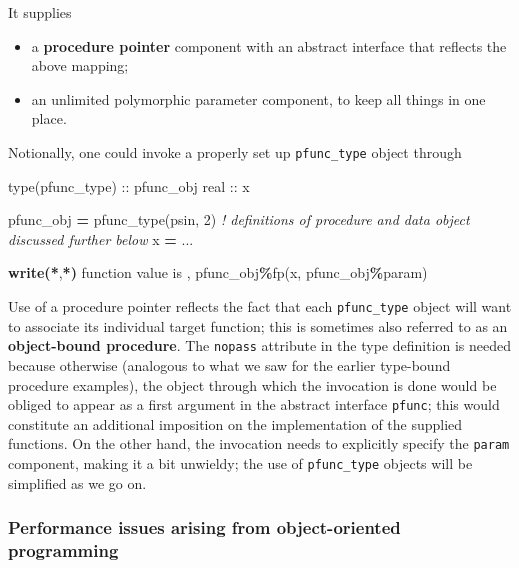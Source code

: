 \documentclass[
  paper=a4,
  ,captions=tableheading
]{scrartcl}
\newenvironment{Shaded}{\begin{snugshade}}{\end{snugshade}}
\newcommand{\CommentTok}[1]{\textcolor[rgb]{0.56,0.35,0.01}{\textit{#1}}}
\newcommand{\DataTypeTok}[1]{\textcolor[rgb]{0.13,0.29,0.53}{#1}}
\newcommand{\DecValTok}[1]{\textcolor[rgb]{0.00,0.00,0.81}{#1}}
\newcommand{\FunctionTok}[1]{\textcolor[rgb]{0.13,0.29,0.53}{\textbf{#1}}}
\newcommand{\KeywordTok}[1]{\textcolor[rgb]{0.13,0.29,0.53}{\textbf{#1}}}
\newcommand{\NormalTok}[1]{#1}
\newcommand{\OperatorTok}[1]{\textcolor[rgb]{0.81,0.36,0.00}{\textbf{#1}}}
\newcommand{\StringTok}[1]{\textcolor[rgb]{0.31,0.60,0.02}{#1}}
\providecommand{\tightlist}{%
  \setlength{\itemsep}{0pt}\setlength{\parskip}{0pt}}
\begin{document}
It supplies

\begin{itemize}
\tightlist
\item
  a \textbf{procedure pointer} component with an abstract interface that
  reflects the above mapping;
\item
  an unlimited polymorphic parameter component, to keep all things in
  one place.
\end{itemize}

Notionally, one could invoke a properly set up \texttt{pfunc\_type}
object through

\begin{Shaded}
\begin{Highlighting}[]
\DataTypeTok{type(pfunc\_type)} \DataTypeTok{::}\NormalTok{ pfunc\_obj}
\DataTypeTok{real} \DataTypeTok{::}\NormalTok{ x}

\NormalTok{pfunc\_obj }\KeywordTok{=}\NormalTok{ pfunc\_type(psin, }\DecValTok{2}\NormalTok{)}
\CommentTok{! definitions of procedure and data object discussed further below}
\NormalTok{x }\KeywordTok{=}\NormalTok{ ...}

\FunctionTok{write(*}\NormalTok{,}\FunctionTok{*)} \StringTok{\textquotesingle{}function value is \textquotesingle{}}\NormalTok{, pfunc\_obj}\OperatorTok{\%}\NormalTok{fp(x, pfunc\_obj}\OperatorTok{\%}\NormalTok{param)}
\end{Highlighting}
\end{Shaded}

Use of a procedure pointer reflects the fact that each
\texttt{pfunc\_type} object will want to associate its individual target
function; this is sometimes also referred to as an \textbf{object-bound
procedure}. The \texttt{nopass} attribute in the type definition is
needed because otherwise (analogous to what we saw for the earlier
type-bound procedure examples), the object through which the invocation
is done would be obliged to appear as a first argument in the abstract
interface \texttt{pfunc}; this would constitute an additional imposition
on the implementation of the supplied functions. On the other hand, the
invocation needs to explicitly specify the \texttt{param} component,
making it a bit unwieldy; the use of \texttt{pfunc\_type} objects will
be simplified as we go on.

\subsubsection{Performance issues arising from object-oriented
programming}\label{performance-issues-arising-from-object-oriented-programming}
\end{document}
